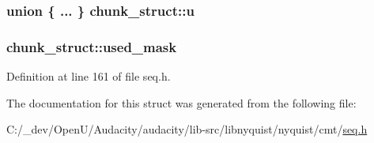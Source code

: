 \subsubsection[{\texorpdfstring{u}{u}}]{\setlength{\rightskip}{0pt plus 5cm}union \{ ... \}   chunk\+\_\+struct\+::u}\hypertarget{structchunk__struct_a935f634166838e9a1f9059a06cc671c4}{}\label{structchunk__struct_a935f634166838e9a1f9059a06cc671c4}
\subsubsection[{\texorpdfstring{used\+\_\+mask}{used_mask}}]{ chunk\+\_\+struct\+::used\+\_\+mask}\hypertarget{structchunk__struct_a41ec36034919a83150bbeefecbbd4a97}{}\label{structchunk__struct_a41ec36034919a83150bbeefecbbd4a97}


Definition at line 161 of file seq.\+h.



The documentation for this struct was generated from the following file\+:\begin{DoxyCompactItemize}
\item 
C\+:/\+\_\+dev/\+Open\+U/\+Audacity/audacity/lib-\/src/libnyquist/nyquist/cmt/\hyperlink{seq_8h}{seq.\+h}\end{DoxyCompactItemize}
